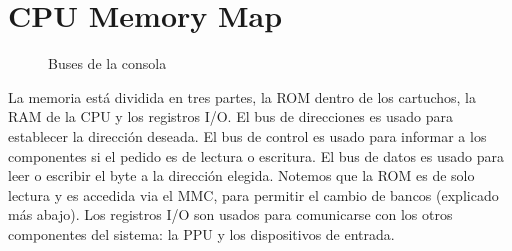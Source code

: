\section{CPU Memory Map}
\begin{figure}[H]\caption{Buses de la consola\label{fig:bus}}
\end{figure}
La memoria está dividida en tres partes, la ROM dentro de los cartuchos, la RAM de la CPU y los registros I/O. El bus de direcciones es usado para establecer la dirección deseada. El bus de control es usado para informar a los componentes si el pedido es de lectura o escritura. El bus de datos es usado para leer o escribir el byte a la dirección elegida. Notemos que la ROM es de solo lectura y es accedida via el MMC, para permitir el cambio de bancos (explicado más abajo). Los registros I/O son usados para comunicarse con los otros componentes del sistema: la PPU y los dispositivos de entrada.

